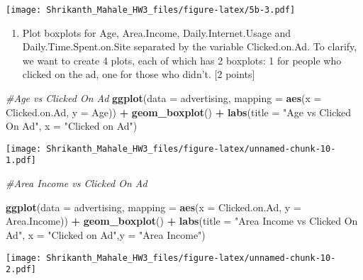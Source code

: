 \documentclass[]{article}
\newenvironment{Shaded}{\begin{snugshade}}{\end{snugshade}}
\newcommand{\KeywordTok}[1]{\textcolor[rgb]{0.13,0.29,0.53}{\textbf{#1}}}
\newcommand{\DataTypeTok}[1]{\textcolor[rgb]{0.13,0.29,0.53}{#1}}
\newcommand{\StringTok}[1]{\textcolor[rgb]{0.31,0.60,0.02}{#1}}
\newcommand{\CommentTok}[1]{\textcolor[rgb]{0.56,0.35,0.01}{\textit{#1}}}
\newcommand{\OperatorTok}[1]{\textcolor[rgb]{0.81,0.36,0.00}{\textbf{#1}}}
\newcommand{\NormalTok}[1]{#1}
\providecommand{\tightlist}{%
  \setlength{\itemsep}{0pt}\setlength{\parskip}{0pt}}
\begin{document}
\texttt{[image: Shrikanth\_Mahale\_HW3\_files/figure-latex/5b-3.pdf]}

\begin{enumerate}
\def\labelenumi{\alph{enumi})}
\setcounter{enumi}{2}
\tightlist
\item
  Plot boxplots for Age, Area.Income, Daily.Internet.Usage and
  Daily.Time.Spent.on.Site separated by the variable Clicked.on.Ad. To
  clarify, we want to create 4 plots, each of which has 2 boxplots: 1
  for people who clicked on the ad, one for those who didn't. {[}2
  points{]}
\end{enumerate}

\begin{Shaded}
\begin{Highlighting}[]
\CommentTok{#Age vs Clicked On Ad}
\KeywordTok{ggplot}\NormalTok{(}\DataTypeTok{data =}\NormalTok{ advertising, }\DataTypeTok{mapping =} \KeywordTok{aes}\NormalTok{(}\DataTypeTok{x =}\NormalTok{ Clicked.on.Ad, }\DataTypeTok{y =}\NormalTok{ Age)) }\OperatorTok{+}\StringTok{ }\KeywordTok{geom_boxplot}\NormalTok{() }\OperatorTok{+}\StringTok{ }\KeywordTok{labs}\NormalTok{(}\DataTypeTok{title =} \StringTok{"Age vs Clicked On Ad"}\NormalTok{, }\DataTypeTok{x =} \StringTok{"Clicked on Ad"}\NormalTok{)}
\end{Highlighting}
\end{Shaded}

\texttt{[image: Shrikanth\_Mahale\_HW3\_files/figure-latex/unnamed-chunk-10-1.pdf]}

\begin{Shaded}
\begin{Highlighting}[]
\CommentTok{#Area Income vs Clicked On Ad}

\KeywordTok{ggplot}\NormalTok{(}\DataTypeTok{data =}\NormalTok{ advertising, }\DataTypeTok{mapping =} \KeywordTok{aes}\NormalTok{(}\DataTypeTok{x =}\NormalTok{ Clicked.on.Ad, }\DataTypeTok{y =}\NormalTok{ Area.Income)) }\OperatorTok{+}\StringTok{ }\KeywordTok{geom_boxplot}\NormalTok{() }\OperatorTok{+}\StringTok{ }\KeywordTok{labs}\NormalTok{(}\DataTypeTok{title =} \StringTok{"Area Income vs Clicked On Ad"}\NormalTok{, }\DataTypeTok{x =} \StringTok{"Clicked on Ad"}\NormalTok{,}\DataTypeTok{y =} \StringTok{"Area Income"}\NormalTok{)}
\end{Highlighting}
\end{Shaded}

\texttt{[image: Shrikanth\_Mahale\_HW3\_files/figure-latex/unnamed-chunk-10-2.pdf]}
\end{document}
